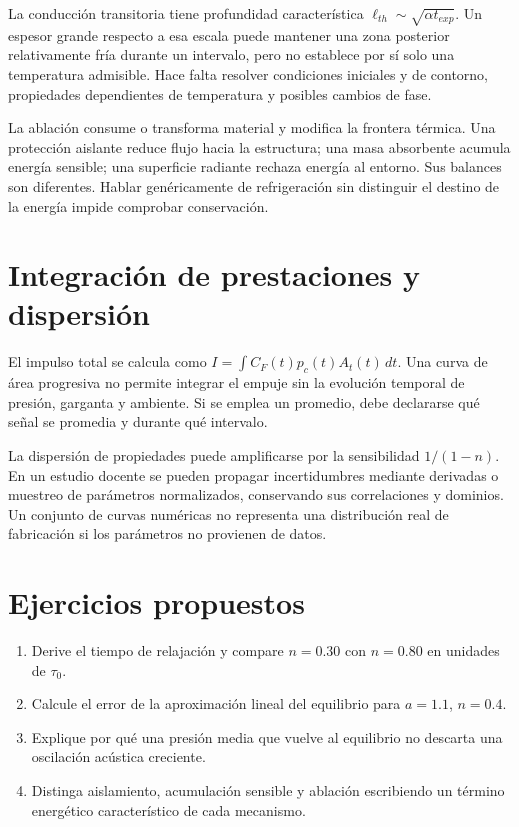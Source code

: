 La conducción transitoria tiene profundidad característica $\ell_{th}\sim\sqrt{\alpha t_{exp}}$. Un espesor grande respecto a esa escala puede mantener una zona posterior relativamente fría durante un intervalo, pero no establece por sí solo una temperatura admisible. Hace falta resolver condiciones iniciales y de contorno, propiedades dependientes de temperatura y posibles cambios de fase.

La ablación consume o transforma material y modifica la frontera térmica. Una protección aislante reduce flujo hacia la estructura; una masa absorbente acumula energía sensible; una superficie radiante rechaza energía al entorno. Sus balances son diferentes. Hablar genéricamente de refrigeración sin distinguir el destino de la energía impide comprobar conservación.\cite{MIT10}
\section{Integración de prestaciones y dispersión}
El impulso total se calcula como $I=\int C_F(t)p_c(t)A_t(t)\,dt$. Una curva de área progresiva no permite integrar el empuje sin la evolución temporal de presión, garganta y ambiente. Si se emplea un promedio, debe declararse qué señal se promedia y durante qué intervalo.

La dispersión de propiedades puede amplificarse por la sensibilidad $1/(1-n)$. En un estudio docente se pueden propagar incertidumbres mediante derivadas o muestreo de parámetros normalizados, conservando sus correlaciones y dominios. Un conjunto de curvas numéricas no representa una distribución real de fabricación si los parámetros no provienen de datos.
\section{Ejercicios propuestos}
\begin{enumerate}
\item Derive el tiempo de relajación y compare $n=0.30$ con $n=0.80$ en unidades de $\tau_0$.
\item Calcule el error de la aproximación lineal del equilibrio para $a=1.1$, $n=0.4$.
\item Explique por qué una presión media que vuelve al equilibrio no descarta una oscilación acústica creciente.
\item Distinga aislamiento, acumulación sensible y ablación escribiendo un término energético característico de cada mecanismo.
\end{enumerate}
